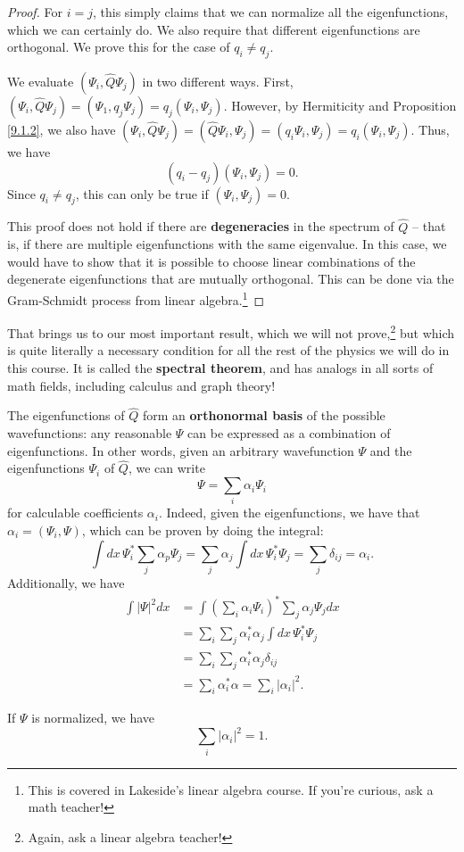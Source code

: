 \begin{framedprop}[The eigenfunctions of $\hat{Q}$ can be organized to satisfy orthonormality: $(\Psi_i,\Psi_j)=\delta_{ij}$]\label{9.2.1}

    \begin{proof}For $i=j$, this simply claims that we can normalize all the eigenfunctions, which we can certainly do. We also require that different eigenfunctions are orthogonal. We prove this for the case of $q_i\neq q_j$.

    We evaluate $(\Psi_i,\hat{Q}\Psi_j)$ in two different ways. First, $(\Psi_i,\hat{Q}\Psi_j)=(\Psi_1,q_j\Psi_j)=q_j(\Psi_i,\Psi_j)$. However, by Hermiticity and Proposition \ref{9.1.2}, we also have $(\Psi_i,\hat{Q}\Psi_j)=(\hat{Q}\Psi_i,\Psi_j)=(q_i\Psi_i,\Psi_j)=q_i(\Psi_i,\Psi_j)$. Thus, we have $$(q_i-q_j)(\Psi_i,\Psi_j)=0.$$Since $q_i\neq q_j$, this can only be true if $(\Psi_i,\Psi_j)=0$.

    This proof does not hold if there are \textbf{degeneracies} in the spectrum of $\hat{Q}$ -- that is, if there are multiple eigenfunctions with the same eigenvalue. In this case, we would have to show that it is possible to choose $\text{linear combinations}$ of the degenerate eigenfunctions that are mutually orthogonal. This can be done via the Gram-Schmidt process from linear algebra.\footnote{This is covered in Lakeside's linear algebra course. If you're curious, ask a math teacher!} \end{proof}
\end{framedprop}

That brings us to our most important result, which we will not prove,\footnote{Again, ask a linear algebra teacher!} but which is quite literally a necessary condition for all the rest of the physics we will do in this course. It is called the \textbf{spectral theorem}, and has analogs in all sorts of math fields, including calculus and graph theory!

\begin{framedthm}\label{spectral}
    The eigenfunctions of $\hat{Q}$ form an \textbf{orthonormal basis} of the possible wavefunctions: any reasonable $\Psi$ can be expressed as a combination of eigenfunctions. In other words, given an arbitrary wavefunction $\Psi$ and the eigenfunctions $\Psi_i$ of $\hat{Q}$, we can write $$\Psi=\sum_i\alpha_i\Psi_i$$for calculable coefficients $\alpha_i$. Indeed, given the eigenfunctions, we have that $\alpha_i=(\Psi_i,\Psi)$, which can be proven by doing the integral: $$\int dx\,\Psi^*_i\sum_j\alpha_p\Psi_j=\sum_j\alpha_j\int dx\,\Psi_i^*\Psi_j=\sum_j\delta_{ij}=\alpha_i.$$Additionally, we have \begin{align*}
    \int|\Psi|^2dx &= \int(\sum_i\alpha_i\Psi_i)^*\sum_j\alpha_j\Psi_j dx \\ &= \sum_i\sum_j\alpha_i^*\alpha_j\int dx\,\Psi_i^*\Psi_j\\ &=\sum_i\sum_j\alpha^*_i\alpha_j\delta_{ij}\\ &=\sum_i\alpha_i^*\alpha=\sum_i|\alpha_i|^2.
    \end{align*}

    If $\Psi$ is normalized, we have $$\sum_i|\alpha_i|^2=1.$$
\end{framedthm}

